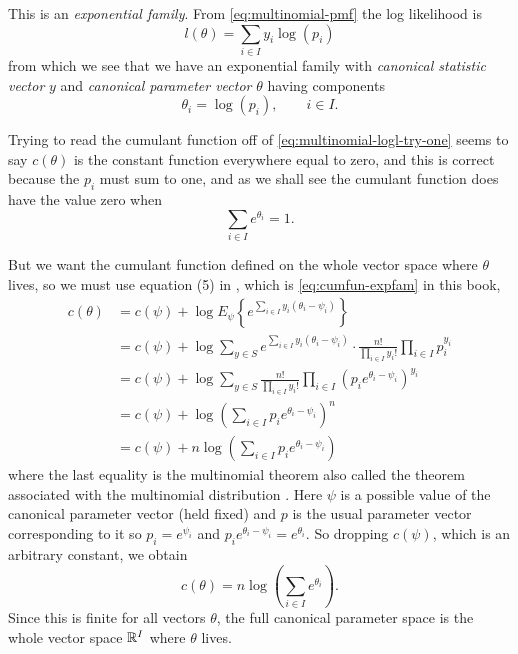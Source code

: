 This is an \emph{exponential family}.  From \eqref{eq:multinomial-pmf}
the log likelihood is
\begin{equation} \label{eq:multinomial-logl-try-one}
   l(\theta) = \sum_{i \in I} y_i \log(p_i)
\end{equation}
from which we see that we have an exponential family with
\emph{canonical statistic vector} $y$ and \emph{canonical parameter vector}
$\theta$ having components
\begin{equation} \label{eq:multinomial-canonical-try-one}
   \theta_i = \log(p_i), \qquad i \in I.
\end{equation}

Trying to read the cumulant function off of \eqref{eq:multinomial-logl-try-one}
seems to say $c(\theta)$ is the constant function everywhere equal to zero,
and this is correct because the $p_i$ must sum to one, and as we shall see
the cumulant function does have the value zero
when
\begin{equation} \label{eq:multinomial-canonical-constraint-try-one}
   \sum_{i \in I} e^{\theta_i} = 1.
\end{equation}

But we want the cumulant function defined on the whole vector space where
$\theta$ lives, so we must use equation (5) in \citet{geyer-gdor},
which is \eqref{eq:cumfun-expfam} in this book,
\begin{align*}
   c(\theta)
   & =
   c(\psi)
   +
   \log E_\psi\left\{ e^{\sum_{i \in I} y_i (\theta_i - \psi_i)} \right\}
   \\
   & =
   c(\psi) + \log \sum_{y \in S}
   e^{\sum_{i \in I} y_i (\theta_i - \psi_i)}
   \cdot
   \frac{n !}{\prod_{i \in I} y_i!} \prod_{i \in I} p_i^{y_i}
   \\
   & =
   c(\psi) + \log \sum_{y \in S}
   \frac{n !}{\prod_{i \in I} y_i!}
   \prod_{i \in I} (p_i e^{\theta_i - \psi_i})^{y_i}
   \\
   & =
   c(\psi) + \log \left( \sum_{i \in I} p_i e^{\theta_i - \psi_i} \right)^n
   \\
   & =
   c(\psi) + n \log \left( \sum_{i \in I} p_i e^{\theta_i - \psi_i} \right)
\end{align*}
where the last equality is the multinomial theorem also called the theorem
associated with the multinomial distribution \citep{brand-name-distributions}.
Here $\psi$ is a possible value of the canonical parameter vector (held fixed)
and $p$ is the usual parameter vector corresponding to it so $p_i = e^{\psi_i}$
and $p_i e^{\theta_i - \psi_i} = e^{\theta_i}$.  So dropping $c(\psi)$,
which is an arbitrary constant, we obtain
\begin{equation} \label{eq:multinomial-cumfun}
   c(\theta) = n \log \left( \sum_{i \in I} e^{\theta_i} \right).
\end{equation}
Since this is finite for all vectors $\theta$, the full canonical parameter
space is the whole vector space $\mathbb{R}^I$ where $\theta$ lives.

